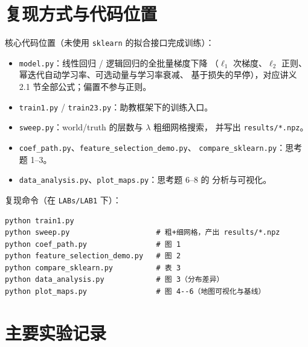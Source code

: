 \documentclass[UTF8,a4paper]{ctexart}
\begin{document}
\newpage
\appendix

\section{复现方式与代码位置}

核心代码位置（未使用 \texttt{sklearn} 的拟合接口完成训练）：
\begin{itemize}
  \item \texttt{model.py}：线性回归 / 逻辑回归的全批量梯度下降
  （$\ell_1$ 次梯度、$\ell_2$ 正则、幂迭代自动学习率、可选动量与学习率衰减、
  基于损失的早停），对应讲义 2.1 节全部公式；偏置不参与正则。
  \item \texttt{train1.py} / \texttt{train23.py}：助教框架下的训练入口。
  \item \texttt{sweep.py}：world/truth 的层数与 $\lambda$ 粗细网格搜索，
  并写出 \texttt{results/*.npz}。
  \item \texttt{coef\_path.py}、\texttt{feature\_selection\_demo.py}、
  \texttt{compare\_sklearn.py}：思考题 1--3。
  \item \texttt{data\_analysis.py}、\texttt{plot\_maps.py}：思考题 6--8 的
  分析与可视化。
\end{itemize}

复现命令（在 \texttt{LABs/LAB1} 下）：
\begin{verbatim}
python train1.py
python sweep.py                    # 粗+细网格，产出 results/*.npz
python coef_path.py                # 图 1
python feature_selection_demo.py   # 图 2
python compare_sklearn.py          # 表 3
python data_analysis.py            # 图 3（分布差异）
python plot_maps.py                # 图 4--6（地图可视化与基线）
\end{verbatim}

\section{主要实验记录}
\end{document}
